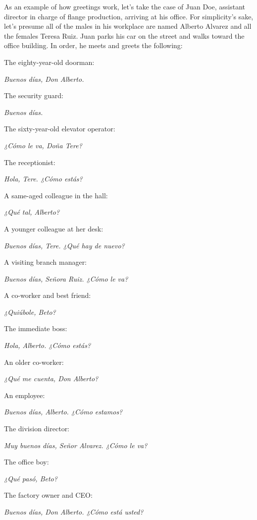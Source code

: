 As an example of how greetings work, let's take the case of
Juan Doe, assistant director in charge of flange production, arriving at
his office. For simplicity's sake, let's presume all of the males in his
workplace are named Alberto Alvarez and all the females Teresa Ruiz.
Juan parks his car on the street and walks toward the office building. In
order, he meets and greets the following:

\bsk

\inda The eighty-year-old doorman:

\indu \emph{Buenos días, Don Alberto.}

\inda The security guard:

\indu \emph{Buenos días.}

\inda The sixty-year-old elevator operator:

\indu \emph{¿Cómo le va, Doña Tere?}

\inda The receptionist:

\indu \emph{Hola, Tere. ¿Cómo estás?}

\inda A same-aged colleague in the hall:

\indu \emph{¿Qué tal, Alberto?}

\inda A younger colleague at her desk:

\indu \emph{Buenos días, Tere. ¿Qué hay de nuevo?}

\inda A visiting branch manager:

\indu \emph{Buenos días, Señora Ruiz. ¿Cómo le va?}

\inda A co-worker and best friend:

\indu \emph{¿Quiúbole, Beto?}

\inda The immediate boss:

\indu \emph{Hola, Alberto. ¿Cómo estás?}

\inda An older co-worker:

\indu \emph{¿Qué me cuenta, Don Alberto?}

\inda An employee:

\indu \emph{Buenos días, Alberto. ¿Cómo estamos?}

\inda The division director:

\indu \emph{Muy buenos días, Señor Alvarez. ¿Cómo le va?}

\inda The office boy:

\indu \emph{¿Qué pasó, Beto?}

\inda The factory owner and CEO:

\indu \emph{Buenos días, Don Alberto. ¿Cómo está usted?}

